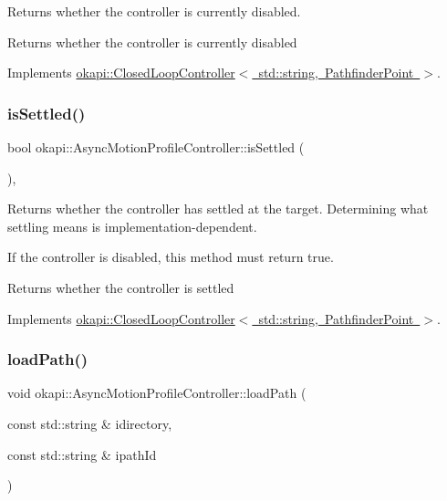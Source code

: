 Returns whether the controller is currently disabled.

\begin{DoxyReturn}{Returns}
whether the controller is currently disabled 
\end{DoxyReturn}


Implements \mbox{\hyperlink{classokapi_1_1ClosedLoopController_a40bd4ec2b8c75503fbf6f494fd7cbe69}{okapi\+::\+Closed\+Loop\+Controller$<$ std\+::string, Pathfinder\+Point $>$}}.

\mbox{\label{classokapi_1_1AsyncMotionProfileController_abfc944ba6d703dc1aa6fb16a44b5e395}} 
\subsubsection{\texorpdfstring{isSettled()}{isSettled()}}
{\footnotesize\ttfamily bool okapi\+::\+Async\+Motion\+Profile\+Controller\+::is\+Settled (\begin{DoxyParamCaption}{ }\end{DoxyParamCaption})\hspace{0.3cm}{\ttfamily [override]}, {\ttfamily [virtual]}}

Returns whether the controller has settled at the target. Determining what settling means is implementation-\/dependent.

If the controller is disabled, this method must return true.

\begin{DoxyReturn}{Returns}
whether the controller is settled 
\end{DoxyReturn}


Implements \mbox{\hyperlink{classokapi_1_1ClosedLoopController_aed7aa0e94b6474c28314f8517d6cb4d8}{okapi\+::\+Closed\+Loop\+Controller$<$ std\+::string, Pathfinder\+Point $>$}}.

\mbox{\label{classokapi_1_1AsyncMotionProfileController_a87c74350a819a3a322321be787c32d1f}} 
\subsubsection{\texorpdfstring{loadPath()}{loadPath()}}
{\footnotesize\ttfamily void okapi\+::\+Async\+Motion\+Profile\+Controller\+::load\+Path (\begin{DoxyParamCaption}\item[{const std\+::string \&}]{idirectory,  }\item[{const std\+::string \&}]{ipath\+Id }\end{DoxyParamCaption})}

